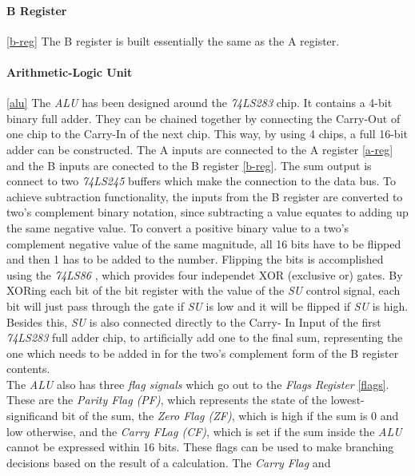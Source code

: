 

\paragraph{B Register} \ref{b-reg}
The B register is built essentially the same as the A register.



\paragraph{Arithmetic-Logic Unit} \ref{alu}
The \emph{ALU} has been designed around the \emph{74LS283} \cite{74ls283} chip. It contains a 4-bit binary full adder.
They can be chained together by connecting the Carry-Out of one chip to the Carry-In of the next chip. This way, by using 4
chips, a full 16-bit adder can be constructed. The A inputs are connected to the A register \ref{a-reg} and the B inputs
are conected to the B register \ref{b-reg}. The sum output is connect to two \emph{74LS245} \cite{74ls245} buffers which make the
connection to the data bus. To achieve subtraction functionality, the inputs from the B register are converted to two's complement
binary  notation, since subtracting a value equates to adding up the same negative value. To convert a positive binary value to a
two's complement negative value of the same magnitude, all 16 bits have to be flipped and then 1 has to be added to the number.
Flipping the bits is accomplished using the \emph{74LS86} \cite{74ls86} , which provides four independet XOR (exclusive or) gates.
By XORing each bit of the bit register with the value of the \emph{SU} control signal, each bit will just pass through the gate
if \emph{SU} is low and it will be flipped if \emph{SU} is high. Besides this, \emph{SU} is also connected directly to the Carry-
In Input of the first \emph{74LS283} full adder chip, to artificially add one to the final sum, representing the one which needs
to be added in for the two's complement form of the B register contents. \\
The \emph{ALU} also has three \emph{flag signals} which go out to the \emph{Flags Register} \ref{flags}. These are the \emph{Parity
Flag (PF)}, which represents the state of the lowest-significand bit of the sum, the \emph{Zero Flag (ZF)}, which is high if the
sum is 0 and low otherwise, and the \emph{Carry FLag (CF)}, which is set if the sum inside the \emph{ALU} cannot be expressed
within 16 bits. These flags can be used to make branching decisions based on the result of a calculation. The \emph{Carry Flag} and
